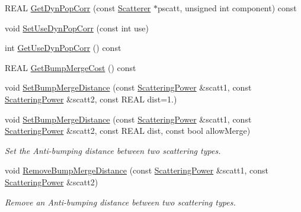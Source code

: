 \begin{DoxyCompactItemize}
R\+E\+AL \mbox{\hyperlink{class_obj_cryst_1_1_crystal_a9328fa012a60adf6b2b17dcfba9f6906}{Get\+Dyn\+Pop\+Corr}} (const \mbox{\hyperlink{class_obj_cryst_1_1_scatterer}{Scatterer}} $\ast$pscatt, unsigned int component) const
\item 
void \mbox{\hyperlink{class_obj_cryst_1_1_crystal_a511c3fcea43446634232eb6df345db9d}{Set\+Use\+Dyn\+Pop\+Corr}} (const int use)
\item 
int \mbox{\hyperlink{class_obj_cryst_1_1_crystal_a72737937d045758014fb9ba533c4eba3}{Get\+Use\+Dyn\+Pop\+Corr}} () const
\item 
R\+E\+AL \mbox{\hyperlink{class_obj_cryst_1_1_crystal_a9d7a5da6a0618589ee256a5bb8128ffa}{Get\+Bump\+Merge\+Cost}} () const
\item 
void \mbox{\hyperlink{class_obj_cryst_1_1_crystal_ad77bfe72588a64e306a5514535ed7404}{Set\+Bump\+Merge\+Distance}} (const \mbox{\hyperlink{class_obj_cryst_1_1_scattering_power}{Scattering\+Power}} \&scatt1, const \mbox{\hyperlink{class_obj_cryst_1_1_scattering_power}{Scattering\+Power}} \&scatt2, const R\+E\+AL dist=1.)
\item 
\mbox{\label{class_obj_cryst_1_1_crystal_a74a095efbf1f414a0707532cb51f78ca}} 
void \mbox{\hyperlink{class_obj_cryst_1_1_crystal_a74a095efbf1f414a0707532cb51f78ca}{Set\+Bump\+Merge\+Distance}} (const \mbox{\hyperlink{class_obj_cryst_1_1_scattering_power}{Scattering\+Power}} \&scatt1, const \mbox{\hyperlink{class_obj_cryst_1_1_scattering_power}{Scattering\+Power}} \&scatt2, const R\+E\+AL dist, const bool allow\+Merge)
\begin{DoxyCompactList}\small\item\em Set the Anti-\/bumping distance between two scattering types. \end{DoxyCompactList}\item 
\mbox{\label{class_obj_cryst_1_1_crystal_ac098ff50897a0afdec066d5f3872a5a1}} 
void \mbox{\hyperlink{class_obj_cryst_1_1_crystal_ac098ff50897a0afdec066d5f3872a5a1}{Remove\+Bump\+Merge\+Distance}} (const \mbox{\hyperlink{class_obj_cryst_1_1_scattering_power}{Scattering\+Power}} \&scatt1, const \mbox{\hyperlink{class_obj_cryst_1_1_scattering_power}{Scattering\+Power}} \&scatt2)
\begin{DoxyCompactList}\small\item\em Remove an Anti-\/bumping distance between two scattering types. \end{DoxyCompactList}\item 

\end{DoxyCompactItemize}
